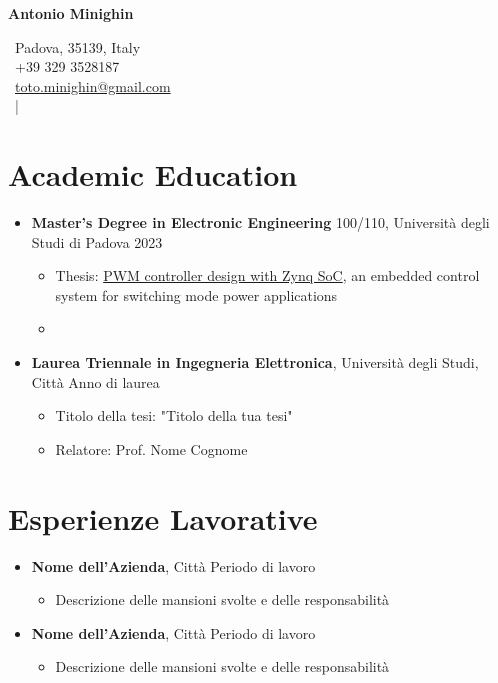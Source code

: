\documentclass[a4paper, 11pt]{article}
\newcommand{\cvsection}[1]{\section*{#1}}
\begin{document}
\begin{center}
    \textbf{\Large Antonio Minighin}
\end{center}
\begin{center}
    \faHome \ Padova, 35139, Italy \\
    \faMobile \ +39 329 3528187 \\
    \faPaperPlane \ \href{mailto://toto.minighin@gmail.com}{toto.minighin@gmail.com} \\
    \href{https://github.com/antomini}{\faGithub} \ | \
    \href{https://linkedin.com/in/antonio-minighin-b92074236}{\faLinkedinSquare}
\end{center}

\section*{Academic Education}
\begin{itemize}[leftmargin=*]
    \item \textbf{Master's Degree in Electronic Engineering} 100/110, Università degli Studi di Padova \hfill 2023
    \begin{itemize}
        \item Thesis: \href{https://thesis.unipd.it/handle/20.500.12608/48003}{PWM controller design with Zynq SoC}, an embedded control system for switching mode power applications
        \item 
    \end{itemize}
    \item \textbf{Laurea Triennale in Ingegneria Elettronica}, Università degli Studi, Città \hfill Anno di laurea
    \begin{itemize}
        \item Titolo della tesi: "Titolo della tua tesi"
        \item Relatore: Prof. Nome Cognome
    \end{itemize}
\end{itemize}

\cvsection{Esperienze Lavorative}
\begin{itemize}[leftmargin=*]
    \item \textbf{Nome dell'Azienda}, Città \hfill Periodo di lavoro
    \begin{itemize}
        \item Descrizione delle mansioni svolte e delle responsabilità
    \end{itemize}
    \item \textbf{Nome dell'Azienda}, Città \hfill Periodo di lavoro
    \begin{itemize}
        \item Descrizione delle mansioni svolte e delle responsabilità
    \end{itemize}
\end{itemize}
\end{document}
